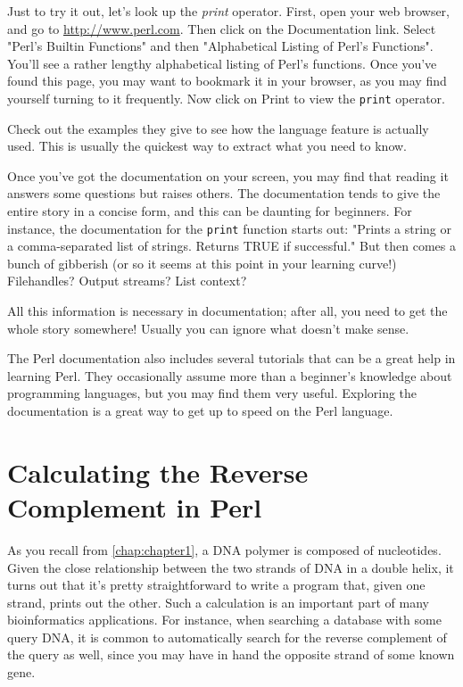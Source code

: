 Just to try it out, let's look up the \textit{print} operator. First, open your web browser, and go to \href{http://www.perl.com}{http://www.perl.com}. Then click on the Documentation link. Select "Perl's Builtin Functions" and then "Alphabetical Listing of Perl's Functions". You'll see a rather lengthy alphabetical listing of Perl's functions. Once you've found this page, you may want to bookmark it in your browser, as you may find yourself turning to it frequently. Now click on Print to view the \verb|print| operator.

Check out the examples they give to see how the language feature is actually used. This is usually the quickest way to extract what you need to know.

Once you've got the documentation on your screen, you may find that reading it answers some questions but raises others. The documentation tends to give the entire story in a concise form, and this can be daunting for beginners. For instance, the documentation for the \verb|print| function starts out: "Prints a string or a comma-separated list of strings. Returns TRUE if successful." But then comes a bunch of gibberish (or so it seems at this point in your learning curve!) Filehandles? Output streams? List context?

All this information is necessary in documentation; after all, you need to get the whole story somewhere! Usually you can ignore what doesn't make sense.

The Perl documentation also includes several tutorials that can be a great help in learning Perl. They occasionally assume more than a beginner's knowledge about programming languages, but you may find them very useful. Exploring the documentation is a great way to get up to speed on the Perl language. 

\section{Calculating the Reverse Complement in Perl}
As you recall from \autoref{chap:chapter1}, a DNA polymer is composed of nucleotides. Given the close relationship between the two strands of DNA in a double helix, it turns out that it's pretty straightforward to write a program that, given one strand, prints out the other. Such a calculation is an important part of many bioinformatics applications. For instance, when searching a database with some query DNA, it is common to automatically search for the reverse complement of the query as well, since you may have in hand the opposite strand of some known gene.

